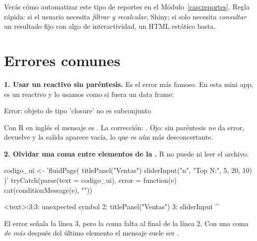 Verás cómo automatizar este tipo de reportes en el
Módulo~\ref{cap:reportes}. Regla rápida: si el usuario necesita
\emph{filtrar y recalcular}, Shiny; si solo necesita \emph{consultar} un
resultado fijo con algo de interactividad, un HTML estático basta.

\section{Errores comunes}
\label{sec:m6-errores}

\textbf{1. Usar un reactivo sin paréntesis.} Es el error más famoso. En
esta mini app,  es un reactivo y lo usamos como si fuera un
data frame:

\begin{rsalida}
Error: objeto de tipo 'closure' no es subconjunto 
\end{rsalida}

Con R en inglés el mensaje es . La corrección: .
Ojo:  sin paréntesis \emph{no} da error, devuelve
 y la salida aparece vacía, lo que es aún más desconcertante.

\textbf{2. Olvidar una coma entre elementos de la .} R no puede
ni leer el archivo:

\begin{rcode}
codigo_ui <- 'fluidPage(
  titlePanel("Ventas")
  sliderInput("n", "Top N:", 5, 20, 10)
)'
tryCatch(parse(text = codigo_ui),
         error = function(e) cat(conditionMessage(e), "\n"))
\end{rcode}
\begin{rsalida}
<text>:3:3: unexpected symbol
2:   titlePanel("Ventas")
3:   sliderInput
     ^ 
\end{rsalida}

El error señala la línea 3, pero la coma falta al final de la línea 2. Con
una coma \emph{de más} después del último elemento el mensaje suele ser
.

